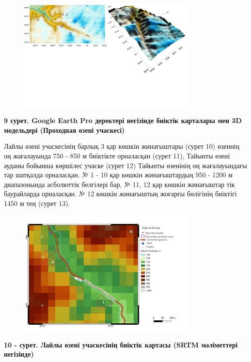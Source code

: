 \begin{figure}[H]
	\centering
	\includegraphics[width=0.8\textwidth]{media/ict2/image212}
	\caption*{}
\end{figure}


{\bfseries 9 сурет. Google Earth Pro деректері негізінде биіктік карталары
мен 3D модельдері (Проходная өзені учаскесі)}

Лайлы өзені учаскесінің барлық 3 қар көшкін жинағыштары (сурет 10)
өзеннің оң жағалауында 750 - 850 м биіктікте орналасқан (сурет 11),
Тайынты өзені ауданы бойынша көршілес учаске (сурет 12) Тайынты өзенінің
оң жағалауындағы тар шатқалда орналасқан. № 1 - 10 қар көшкін
жинағыштардың 950 - 1200 м диапазонында асболюттік белгілері бар, № 11,
12 қар көшкін жинағыштар тік баурайларда орналасқан. № 12 көшкін
жинағыштың жоғарғы бөлігінің биіктігі 1450 м тең (сурет 13).


\begin{figure}[H]
	\centering
	\includegraphics[width=0.8\textwidth]{media/ict2/image213}
	\caption*{}
\end{figure}


{\bfseries 10 - сурет. Лайлы өзені учаскесінің биіктік картасы (SRTM
мәліметтері негізінде)}


